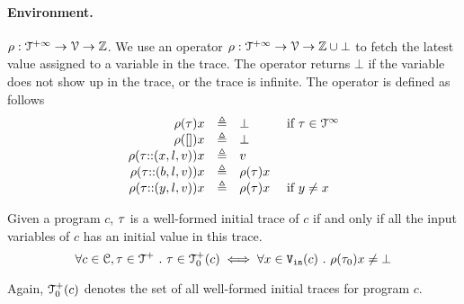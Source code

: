 \paragraph{Environment.} $\rho : {\mathcal{T}^{+\infty}}  \to \mathcal{V} \to \mathbb{Z}$.  
We use an operator $\rho: {\mathcal{T}^{+\infty}} \to \mathcal{V} \to \mathbb{Z}\cup\bot$ to fetch the latest value assigned to a variable in the trace. The operator returns $\bot$ if the variable does not show up in the trace, or the trace is infinite. The operator is defined as follows
    \[
\begin{array}{rcll}
\rho(\mathtt{\tau} ) x &\triangleq& \bot &~ \text{if}~ \mathtt{\tau} \in \mathcal{T}^{\infty}\\
 \rho({[]} ) x &\triangleq& \bot&\\
\rho(\mathtt{\tau}  {\small ::} (x, l, v)) x &\triangleq& v
\\
\rho(\mathtt{\tau} {\small ::} (b, l, v)) x &\triangleq& \rho(\mathtt{\tau}) x
\\
\rho(\mathtt{\tau} {\small ::} (y, l, v)) x &\triangleq& \rho(\mathtt{\tau}) x & ~ \text{if}~ y \neq x
\end{array}
\]
%
\begin{defn}
  \label{def:initial_trace}
  Given a program $c$, $\mathtt{\tau}$ is a well-formed initial trace of $c$ if and only if all the input variables of $c$ has an initial value in this trace.
  \[
    \forall c \in \mathcal{C}, \mathtt{\tau} \in \mathcal{T}^{+} ~.~ \mathtt{\tau} \in \mathcal{T}^{+}_0(c) \iff 
    \forall x \in {\ensuremath{\mathtt{V_{\mathtt{in}}}}}(c) ~.~ \rho(\mathtt{\tau}_0) x \neq \bot
    \]
\end{defn}
%
Again, $\mathcal{T}^{+}_0(c)$ denotes the set of all well-formed initial traces for program $c$.
%
